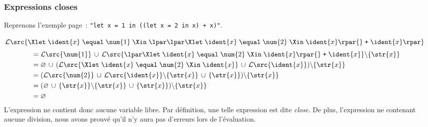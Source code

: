 %
\begin{frame}[containsverbatim]
\frametitle{Expressions closes}

Reprenons l'exemple page~\pageref{un_exemple_complexe}:
\verb|"let x = 1 in ((let x = 2 in x) + x)"|.

\medskip

\({\cal L} \src{\Xlet \; \ident{x} \; \equal \; \num{1} \; \Xin \;
  \lpar\lpar\Xlet \; \ident{x} \; \equal \; \num{2} \; \Xin \;
  \ident{x}\rpar{} \; \texttt{+} \; \ident{x}\rpar}\)
\begin{align*}
&= {\cal L}
  \src{\num{1}} \, \cup \, {\cal L} \src{\lpar\Xlet \; \ident{x} \;
  \equal \; \num{2} \; \Xin \; \ident{x}\rpar{} \; \texttt{+}
  \; \ident{x}} \backslash \{\str{x}\}\\
 &= \varnothing
     \, \cup \,
     ({\cal L} \src{\Xlet \; \ident{x} \; \equal \; \num{2} \;
     \Xin \; \ident{x}} \, \cup \, {\cal L} \src{\ident{x}})
     \backslash \{\str{x}\} \\
 &= ({\cal L} \src{\num{2}} \, \cup \, {\cal L} \src{\ident{x}} \backslash
      \{\str{x}\} \, \cup \, \{\str{x}\}) \backslash \{\str{x}\}\\
 &= (\varnothing
      \, \cup \,
      \{\str{x}\}
     \backslash \{\str{x}\}
     \, \cup \,
     \{\str{x}\})
     \backslash \{\str{x}\}\\
 &= \varnothing
\end{align*}
L'expression ne contient donc aucune variable libre. Par définition,
une telle expression est dite \emph{close}. De plus, l'expression ne
contenant aucune division, nous avons prouvé qu'il n'y aura pas
d'erreurs lors de l'évaluation.

\end{frame}

